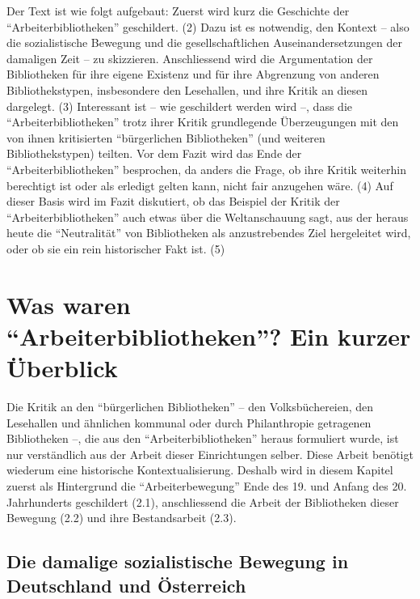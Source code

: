 \documentclass[a4paper,
fontsize=11pt,
oneside,
numbers=noperiodatend,
parskip=half-,
bibliography=totoc,
final
]{scrartcl}
\begin{document}
Der Text ist wie folgt aufgebaut: Zuerst wird kurz die Geschichte der
\enquote{Arbeiterbibliotheken} geschildert. (2) Dazu ist es notwendig,
den Kontext -- also die sozialistische Bewegung und die
gesellschaftlichen Auseinandersetzungen der damaligen Zeit -- zu
skizzieren. Anschliessend wird die Argumentation der Bibliotheken für
ihre eigene Existenz und für ihre Abgrenzung von anderen
Bibliothekstypen, insbesondere den Lesehallen, und ihre Kritik an diesen
dargelegt. (3) Interessant ist -- wie geschildert werden wird --, dass
die \enquote{Arbeiterbibliotheken} trotz ihrer Kritik grundlegende
Überzeugungen mit den von ihnen kritisierten \enquote{bürgerlichen
Bibliotheken} (und weiteren Bibliothekstypen) teilten. Vor dem Fazit
wird das Ende der \enquote{Arbeiterbibliotheken} besprochen, da anders
die Frage, ob ihre Kritik weiterhin berechtigt ist oder als erledigt
gelten kann, nicht fair anzugehen wäre. (4) Auf dieser Basis wird im
Fazit diskutiert, ob das Beispiel der Kritik der
\enquote{Arbeiterbibliotheken} auch etwas über die Weltanschauung sagt,
aus der heraus heute die \enquote{Neutralität} von Bibliotheken als
anzustrebendes Ziel hergeleitet wird, oder ob sie ein rein historischer
Fakt ist. (5)

\hypertarget{was-waren-arbeiterbibliotheken-ein-kurzer-uxfcberblick}{%
\section{\texorpdfstring{Was waren \enquote{Arbeiterbibliotheken}?
Ein kurzer
Überblick}{Was waren \enquote{Arbeiterbibliotheken}? Ein kurzer Überblick}}\label{was-waren-arbeiterbibliotheken-ein-kurzer-uxfcberblick}}

Die Kritik an den \enquote{bürgerlichen Bibliotheken} -- den
Volksbüchereien, den Lesehallen und ähnlichen kommunal oder durch
Philanthropie getragenen Bibliotheken --, die aus den
\enquote{Arbeiterbibliotheken} heraus formuliert wurde, ist nur
verständlich aus der Arbeit dieser Einrichtungen selber. Diese Arbeit
benötigt wiederum eine historische Kontextualisierung. Deshalb wird in
diesem Kapitel zuerst als Hintergrund die \enquote{Arbeiterbewegung}
Ende des 19. und Anfang des 20. Jahrhunderts geschildert (2.1),
anschliessend die Arbeit der Bibliotheken dieser Bewegung (2.2) und ihre
Bestandsarbeit (2.3).

\hypertarget{die-damalige-sozialistische-bewegung-in-deutschland-und-uxf6sterreich}{%
\subsection{Die damalige sozialistische Bewegung in Deutschland und
Österreich}\label{die-damalige-sozialistische-bewegung-in-deutschland-und-uxf6sterreich}}
\end{document}
